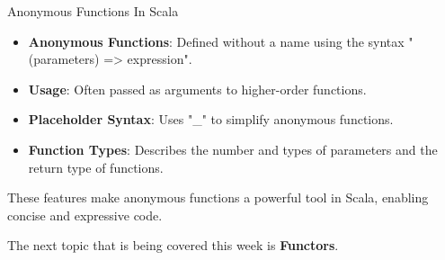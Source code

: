 \begin{notes}{Anonymous Functions In Scala}
\begin{highlight}
        \begin{itemize}
            \item \textbf{Anonymous Functions}: Defined without a name using the syntax "(parameters) => expression".
            \item \textbf{Usage}: Often passed as arguments to higher-order functions.
            \item \textbf{Placeholder Syntax}: Uses "\_" to simplify anonymous functions.
            \item \textbf{Function Types}: Describes the number and types of parameters and the return type of functions.
        \end{itemize}
        
        These features make anonymous functions a powerful tool in Scala, enabling concise and expressive code.
    
    \end{highlight}
\end{notes}

The next topic that is being covered this week is \textbf{Functors}.

